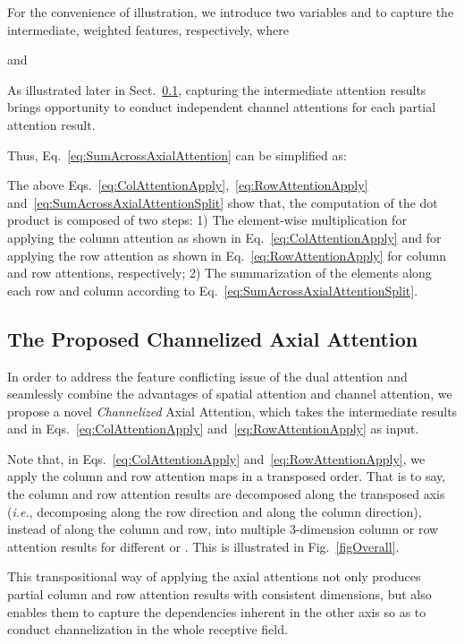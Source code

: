 \documentclass[journal]{IEEEtran}
\begin{document}
For the convenience of illustration, we introduce two variables  and  to capture the intermediate, weighted features, respectively, where

and


As illustrated later in Sect.~\ref{sChannelizedAttention}, capturing the intermediate attention results brings opportunity to conduct independent channel attentions for each partial attention result.

Thus, Eq.~\eqref{eq:SumAcrossAxialAttention} can be simplified as:


The above Eqs.~\eqref{eq:ColAttentionApply},~\eqref{eq:RowAttentionApply} and~\eqref{eq:SumAcrossAxialAttentionSplit} show that, the computation of the dot product is composed of two steps: 1) The element-wise multiplication for applying the column attention as shown in Eq.~\eqref{eq:ColAttentionApply} and for applying the row attention as shown in Eq.~\eqref{eq:RowAttentionApply} for column and row attentions, respectively; 
2) The summarization of the elements along each row and column according to Eq.~\eqref{eq:SumAcrossAxialAttentionSplit}.




\subsection {The Proposed Channelized Axial Attention}
\label {sChannelizedAttention}

In order to address the feature conflicting issue of the dual attention and seamlessly combine the advantages of spatial attention and channel attention, we propose a novel \textit{Channelized} Axial Attention, which takes the intermediate results  and  in Eqs.~\eqref{eq:ColAttentionApply} and~\eqref{eq:RowAttentionApply} as input.

Note that, in Eqs.~\eqref{eq:ColAttentionApply} and~\eqref{eq:RowAttentionApply}, we apply the column and row attention maps in a transposed order. 
That is to say, the column and row attention results are decomposed along the transposed axis (\textit{i.e.}, decomposing  along the row direction and  along the column direction), instead of along the column and row, into multiple 3-dimension column or row attention results for different  or .  
This is illustrated in Fig.~\ref{figOverall}. 

This transpositional way of applying the axial attentions not only produces partial column and row attention results with consistent dimensions, but also enables them to capture the dependencies inherent in the other axis so as to conduct channelization in the whole receptive field.
\end{document}
